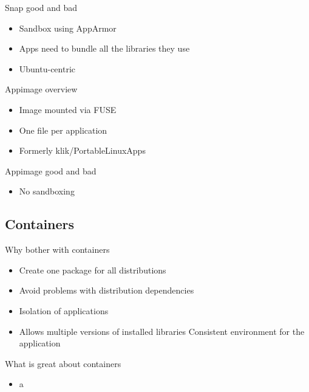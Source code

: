 \documentclass{beamer}
\begin{document}
\begin{frame}[t]{Snap good and bad}
	\begin{itemize}
	\item Sandbox using AppArmor
	\item Apps need to bundle all the libraries they use
	\item Ubuntu-centric
	\end{itemize}
\end{frame}

\begin{frame}[t]{Appimage overview}
	\begin{itemize}
	\item Image mounted via FUSE
	\item One file per application
	\item Formerly klik/PortableLinuxApps
	\end{itemize}
\end{frame}

\begin{frame}[t]{Appimage good and bad}
	\begin{itemize}
	\item No sandboxing
	\end{itemize}
\end{frame}

\subsection{Containers}

\begin{frame}[t]{Why bother with containers}
	\begin{itemize}
	\item Create one package for all distributions
	\item Avoid problems with distribution dependencies
	\item Isolation of applications
	\item Allows multiple versions of installed libraries
	\itme Consistent environment for the application
	\end{itemize}
\end{frame}

\begin{frame}[t]{What is great about containers}
	\begin{itemize}
	\item a
	\end{itemize}
\end{frame}
\end{document}
